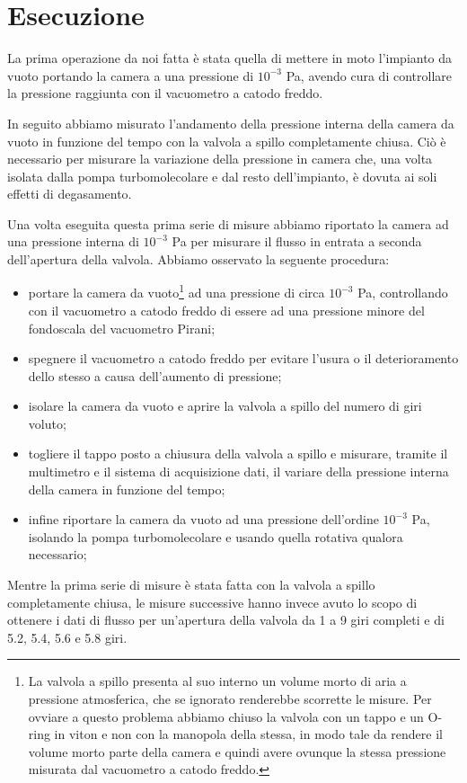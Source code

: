 \section{Esecuzione}

La prima operazione da noi fatta è stata quella di mettere in moto l'impianto da vuoto portando la camera a una pressione di $10^{-3}$ \si{\pascal}, avendo cura di controllare la pressione raggiunta con il vacuometro a catodo freddo.

In seguito abbiamo misurato l'andamento della pressione interna della camera da vuoto in funzione del tempo con la valvola a spillo completamente chiusa. Ciò è necessario per misurare la variazione della pressione in camera che, una volta isolata dalla pompa turbomolecolare e dal resto dell'impianto, è dovuta ai soli effetti di degasamento.

Una volta eseguita questa prima serie di misure abbiamo riportato la camera ad una pressione interna di $10^{-3}$ \si{\pascal} per misurare il flusso in entrata a seconda dell'apertura della valvola. Abbiamo osservato la seguente procedura:
\begin{itemize}
	\item{portare la camera da vuoto\footnote{La valvola a spillo presenta al suo interno un volume morto di aria a pressione atmosferica, che se ignorato renderebbe scorrette le misure. Per ovviare a questo problema abbiamo chiuso la valvola con un tappo e un O-ring in viton e non con la manopola della stessa, in modo tale da rendere il volume morto parte della camera e quindi avere ovunque la stessa pressione misurata dal vacuometro a catodo freddo.} ad una pressione di circa $10^{-3}$ \si{\pascal}, controllando con il vacuometro a catodo freddo di essere ad una pressione minore del fondoscala del vacuometro Pirani;}
	\item{spegnere il vacuometro a catodo freddo per evitare l'usura o il deterioramento dello stesso a causa dell'aumento di pressione;}
	\item{isolare la camera da vuoto e aprire la valvola a spillo del numero di giri voluto;}
	\item{togliere il tappo posto a chiusura della valvola a spillo e misurare, tramite il multimetro e il sistema di acquisizione dati, il variare della pressione interna della camera in funzione del tempo;}
	\item{infine riportare la camera da vuoto ad una pressione dell'ordine $10^{-3}$ \si{\pascal}, isolando la pompa turbomolecolare e usando quella rotativa qualora necessario;}
\end{itemize}
Mentre la prima serie di misure è stata fatta con la valvola a spillo completamente chiusa, le misure successive hanno invece avuto lo scopo di ottenere i dati di flusso per un'apertura della valvola da 1 a 9 giri completi e di 5.2, 5.4, 5.6 e 5.8 giri.\\

